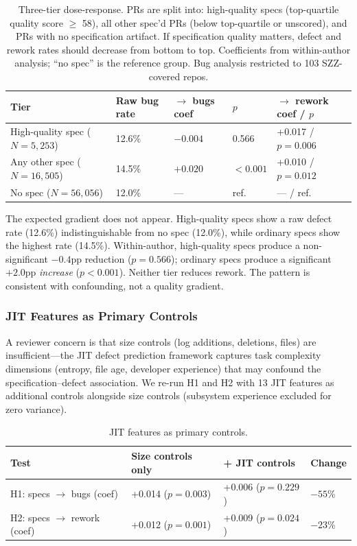 \documentclass[a4paper,UKenglish,cleveref,autoref,thm-restate]{lipics-v2021}
\begin{document}
\begin{table}[t]
\centering
\caption{Three-tier dose-response. PRs are split into: high-quality specs (top-quartile quality score $\geq$ 58), all other spec'd PRs (below top-quartile or unscored), and PRs with no specification artifact. If specification quality matters, defect and rework rates should decrease from bottom to top. Coefficients from within-author analysis; ``no spec'' is the reference group. Bug analysis restricted to 103 SZZ-covered repos.}
\label{tab:dose-response}
\begin{tabular}{@{}lllll@{}}
\toprule
\textbf{Tier} & \textbf{Raw bug rate} & \textbf{$\rightarrow$ bugs coef} & \textbf{$p$} & \textbf{$\rightarrow$ rework coef / $p$} \\
\midrule
High-quality spec ($N = 5{,}253$) & 12.6\% & $-0.004$ & 0.566 & +0.017 / $p = 0.006$ \\
Any other spec ($N = 16{,}505$) & 14.5\% & $+0.020$ & $< 0.001$ & +0.010 / $p = 0.012$ \\
No spec ($N = 56{,}056$) & 12.0\% & --- & ref. & --- / ref. \\
\bottomrule
\end{tabular}
\end{table}

The expected gradient does not appear. High-quality specs show a raw defect rate (12.6\%) indistinguishable from no spec (12.0\%), while ordinary specs show the highest rate (14.5\%). Within-author, high-quality specs produce a non-significant $-0.4$pp reduction ($p = 0.566$); ordinary specs produce a significant $+2.0$pp \emph{increase} ($p < 0.001$). Neither tier reduces rework. The pattern is consistent with confounding, not a quality gradient.

\subsubsection{JIT Features as Primary Controls}

A reviewer concern is that size controls (log additions, deletions, files) are insufficient---the JIT defect prediction framework \cite{kamei2013} captures task complexity dimensions (entropy, file age, developer experience) that may confound the specification--defect association. We re-run H1 and H2 with 13 JIT features as additional controls alongside size controls (subsystem experience excluded for zero variance).

\begin{table}[t]
\centering
\caption{JIT features as primary controls.}
\label{tab:jit}
\begin{tabular}{@{}llll@{}}
\toprule
\textbf{Test} & \textbf{Size controls only} & \textbf{+ JIT controls} & \textbf{Change} \\
\midrule
H1: specs $\rightarrow$ bugs (coef) & +0.014 ($p = 0.003$) & +0.006 ($p = 0.229$) & $-55$\% \\
H2: specs $\rightarrow$ rework (coef) & +0.012 ($p = 0.001$) & +0.009 ($p = 0.024$) & $-23$\% \\
\bottomrule
\end{tabular}
\end{table}
\end{document}
